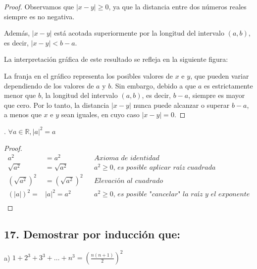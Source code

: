 \documentclass{article}
\begin{document}
\begin{proof}
Observamos que \(|x - y|\geq 0\), ya que la distancia entre dos números reales siempre es no negativa.

Además, \(|x - y|\) está acotada superiormente por la longitud del intervalo \((a, b)\), es decir, \(|x - y| < b - a\).

La interpretación gráfica de este resultado se refleja en la siguiente figura:

\begin{center}
\end{center}

La franja en el gráfico representa los posibles valores de \(x\) e \(y\), que pueden variar dependiendo de los valores de \(a\) y \(b\). Sin embargo, debido a que \(a\) es estrictamente menor que \(b\), la longitud del intervalo \((a, b)\), es decir, \(b - a\), siempre es mayor que cero. Por lo tanto, la distancia \(|x - y|\) nunca puede alcanzar o superar \(b - a\), a menos que \(x\) e \(y\) sean iguales, en cuyo caso \(|x - y| = 0\).
\end{proof}

. \( \forall a \in \mathbb{R}, |a|^2 = a\) \\
\begin{proof}
\begin{align*}
    a^2 &= a^2 && \textit{Axioma de identidad} \\
\sqrt{a^2} &= \sqrt{a^2} && a^2 \geq 0 \textit{, es posible aplicar raíz cuadrada} \\
(\sqrt{a^2})^2 &= (\sqrt{a^2})^2 && \textit{Elevación al cuadrado} \\
(|a|)^2 = &|a|^2 = a^2 && a^2 \geq 0\textit{, es posible "cancelar" la raíz y el exponente} \\
\end{align*}


\end{proof}

\newpage
\subsection*{17. Demostrar por inducción que:}

  a) \(1+2^3+3^3+\ldots+n^3=\left(\frac{n(n+1)}{2}\right)^2\) \\
\end{document}
